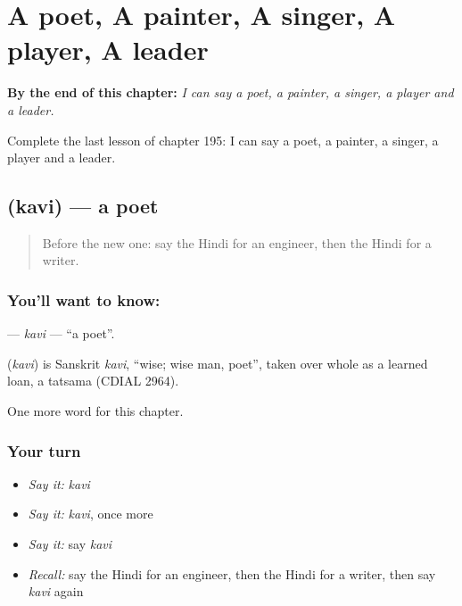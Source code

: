 
\chapter{A poet, A painter, A singer, A player, A leader}
\label{ch:hi-a-poet-a-painter-a-singer-a-player-a-leader}

\begin{chapteropening}
\textbf{By the end of this chapter:} \emph{I can say a poet, a painter, a singer, a player and a leader.}

Complete the last lesson of chapter 195: I can say a poet, a painter, a singer, a player and a leader.
\end{chapteropening}

\section[\texorpdfstring{\hi{कवि} (kavi)}{कवि (kavi)}]{ (kavi) — a poet}

\label{lesson:HI-C195-kavi}



\begin{quote}
Before the new one: say the Hindi for an engineer, then the Hindi for a writer.
\end{quote}

\subsection*{You'll want to know: }
\textbf{} — \emph{kavi} — \textquotedblleft{}a poet\textquotedblright{}.

\begin{cousinweb}
\textbf{} (\emph{kavi}) is Sanskrit \emph{kavi}, \textquotedblleft{}wise; wise man, poet\textquotedblright{}, taken over whole as a learned loan, a tatsama (CDIAL 2964).
\end{cousinweb}

\begin{grammarlens}[title={What you've built}]
One more word for this chapter.
\end{grammarlens}

\subsection*{Your turn}
\begin{itemize}
\raggedright
  \item \emph{Say it:} \emph{kavi}
  \item \emph{Say it:} \emph{kavi}, once more
  \item \emph{Say it:} say \emph{kavi}
  \item \emph{Recall:} say the Hindi for an engineer, then the Hindi for a writer, then say \emph{kavi} again
\end{itemize}

